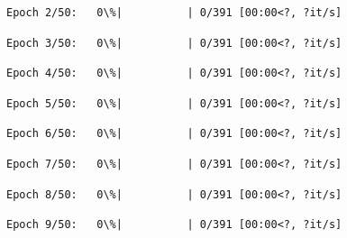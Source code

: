 \documentclass[11pt]{article}
\begin{document}
    
    
    \begin{Verbatim}[commandchars=\\\{\}]
Epoch 2/50:   0\%|          | 0/391 [00:00<?, ?it/s]
    \end{Verbatim}

    
    
    \begin{Verbatim}[commandchars=\\\{\}]
Epoch 3/50:   0\%|          | 0/391 [00:00<?, ?it/s]
    \end{Verbatim}

    
    
    \begin{Verbatim}[commandchars=\\\{\}]
Epoch 4/50:   0\%|          | 0/391 [00:00<?, ?it/s]
    \end{Verbatim}

    
    
    \begin{Verbatim}[commandchars=\\\{\}]
Epoch 5/50:   0\%|          | 0/391 [00:00<?, ?it/s]
    \end{Verbatim}

    
    
    \begin{Verbatim}[commandchars=\\\{\}]
Epoch 6/50:   0\%|          | 0/391 [00:00<?, ?it/s]
    \end{Verbatim}

    
    
    \begin{Verbatim}[commandchars=\\\{\}]
Epoch 7/50:   0\%|          | 0/391 [00:00<?, ?it/s]
    \end{Verbatim}

    
    
    \begin{Verbatim}[commandchars=\\\{\}]
Epoch 8/50:   0\%|          | 0/391 [00:00<?, ?it/s]
    \end{Verbatim}

    
    
    \begin{Verbatim}[commandchars=\\\{\}]
Epoch 9/50:   0\%|          | 0/391 [00:00<?, ?it/s]
    \end{Verbatim}
\end{document}
